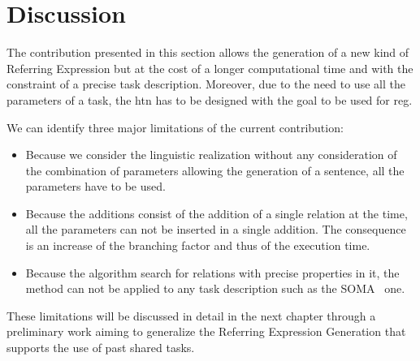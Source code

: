 
\section{Discussion}

The contribution presented in this section allows the generation of a new kind of Referring Expression but at the cost of a longer computational time and with the constraint of a precise task description. Moreover, due to the need to use all the parameters of a task, the \acrshort{htn} has to be designed with the goal to be used for \acrshort{reg}.

We can identify three major limitations of the current contribution:
\begin{itemize}
  \item Because we consider the linguistic realization without any consideration of the combination of parameters allowing the generation of a sentence, all the parameters have to be used.
  \item Because the additions consist of the addition of a single relation at the time, all the parameters can not be inserted in a single addition. The consequence is an increase of the branching factor and thus of the execution time.
  \item Because the algorithm search for relations with precise properties in it, the method can not be applied to any task description such as the SOMA~\cite{bessler_2020_foundations} one.
\end{itemize}

These limitations will be discussed in detail in the next chapter through a preliminary work aiming to generalize the Referring Expression Generation that supports the use of past shared tasks.